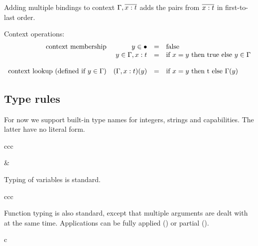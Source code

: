 \documentclass[11pt]{article}
\begin{document}
Adding multiple bindings to context $\Gamma,\overline{x : t}$ adds the pairs from $\overline{x : t}$ in first-to-last order.

Context operations:
\[
\begin{array}{rrcll}
\text{context membership}
  & y \in \bullet                      & = & \text{false} \\
  & y \in \Gamma,x : t & = & \text{if $x = y$ then true else $y \in \Gamma$} \\
\\
\text{context lookup (defined if $y \in \Gamma$)}
  & (\Gamma,x : t)(y) & = & \text{if $x = y$ then t else $\Gamma(y)$} \\
\end{array}
\]

\subsection{Type rules}

For now we support built-in type names for integers, strings and capabilities.
The latter have no literal form.

\begin{rules}{ccc}


&


\end{rules}

Typing of variables is standard.

\begin{rules}{ccc}


\end{rules}

Function typing is also standard, except that multiple arguments are dealt with at the same time.
Applications can be fully applied () or partial ().

\begin{rules}{c}

\inference[T-FUN]{
  \infe{\consc{\Gamma}{\bnds{x}{t}}}{e}{t}
}{
  \infe{\Gamma}{\fune{\repz{\arge{x}{t}}}{e}}{\funty{\repz{t}}{t}}
}

\end{rules}
\end{document}
